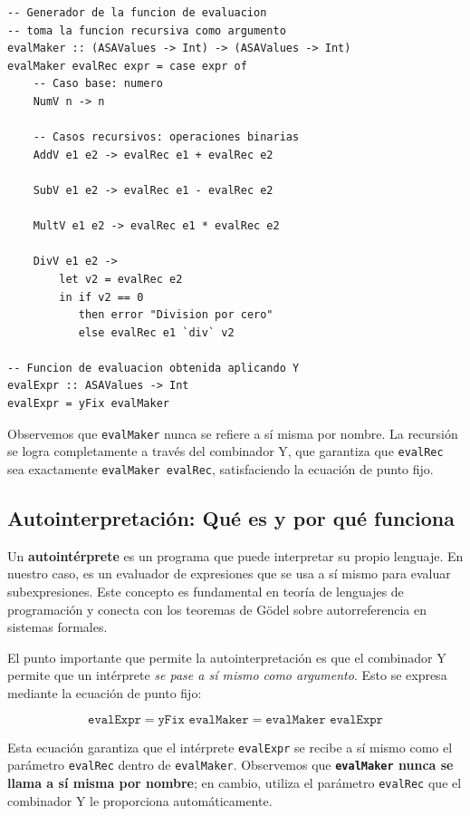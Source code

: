 \documentclass[11pt]{article}
\begin{document}
\begin{lstlisting}[caption={Función de evaluación con combinador Y}]
-- Generador de la funcion de evaluacion
-- toma la funcion recursiva como argumento
evalMaker :: (ASAValues -> Int) -> (ASAValues -> Int)
evalMaker evalRec expr = case expr of
    -- Caso base: numero
    NumV n -> n

    -- Casos recursivos: operaciones binarias
    AddV e1 e2 -> evalRec e1 + evalRec e2

    SubV e1 e2 -> evalRec e1 - evalRec e2

    MultV e1 e2 -> evalRec e1 * evalRec e2

    DivV e1 e2 ->
        let v2 = evalRec e2
        in if v2 == 0
           then error "Division por cero"
           else evalRec e1 `div` v2

-- Funcion de evaluacion obtenida aplicando Y
evalExpr :: ASAValues -> Int
evalExpr = yFix evalMaker
\end{lstlisting}

Observemos que \texttt{evalMaker} nunca se refiere a sí misma por nombre. La recursión se logra completamente a través del combinador Y, que garantiza que \texttt{evalRec} sea exactamente \texttt{evalMaker evalRec}, satisfaciendo la ecuación de punto fijo.





\subsection{Autointerpretación: Qué es y por qué funciona}

Un \textbf{autointérprete} es un programa que puede interpretar su propio lenguaje. En nuestro caso, es un evaluador de expresiones que se usa a sí mismo para evaluar subexpresiones. Este concepto es fundamental en teoría de lenguajes de programación y conecta con los teoremas de Gödel sobre autorreferencia en sistemas formales.

El punto importante que permite la autointerpretación es que el combinador Y permite que un intérprete \textit{se pase a sí mismo como argumento}. Esto se expresa mediante la ecuación de punto fijo:

\begin{equation*}
\texttt{evalExpr} = \texttt{yFix evalMaker} = \texttt{evalMaker evalExpr}
\end{equation*}

Esta ecuación garantiza que el intérprete \texttt{evalExpr} se recibe a sí mismo como el parámetro \texttt{evalRec} dentro de \texttt{evalMaker}. Observemos que \textbf{\texttt{evalMaker} nunca se llama a sí misma por nombre}; en cambio, utiliza el parámetro \texttt{evalRec} que el combinador Y le proporciona automáticamente.
\end{document}
